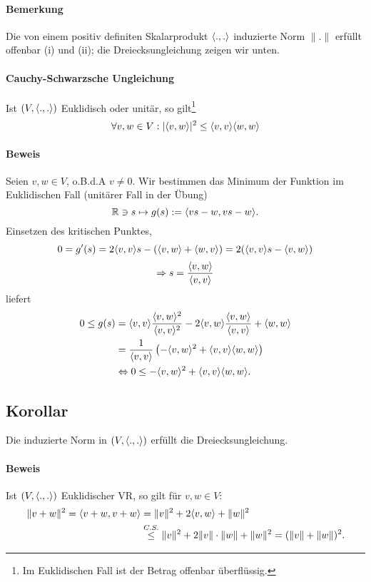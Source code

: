 \paragraph{Bemerkung}
	Die von einem positiv definiten Skalarprodukt $ \langle .,. \rangle $ induzierte Norm $ \|.\| $ erfüllt offenbar (i) und (ii); die Dreiecksungleichung zeigen wir unten.
\paragraph{Cauchy-Schwarzsche Ungleichung}
\begin{Satz}
	Ist $ (V,\langle .,. \rangle) $ Euklidisch oder unitär, so gilt\footnote{Im Euklidischen Fall ist der Betrag offenbar überflüssig.}
		\[ \forall v,w\in V: |\langle v,w \rangle|^2 \leq \langle v,v \rangle\langle w,w \rangle \]
\end{Satz}
\paragraph{Beweis}
	Seien $ v,w\in V $, o.B.d.A $ v\neq 0 $. Wir bestimmen das Minimum der Funktion im Euklidischen Fall (unitärer Fall in der Übung)
		\[ \mathbb{R} \ni s\mapsto g(s):= \langle vs-w,vs-w \rangle. \]
	Einsetzen des kritischen Punktes,
		\[ 0 = g'(s) = 2\langle v,v \rangle s -(\langle v,w \rangle+\langle w,v \rangle) = 2(\langle v,v \rangle s-\langle v,w \rangle) \]
		\[ \Rightarrow s = \frac{\langle v,w \rangle}{\langle v,v \rangle} \]
	liefert
		\begin{align*}
			0\leq g(s) &= \langle v,v \rangle\frac{\langle v,w \rangle^2}{\langle v,v \rangle^2}-2\langle v,w \rangle\frac{\langle v,w \rangle}{\langle v,v \rangle}+\langle w,w \rangle\\
			&= \frac{1}{\langle v,v \rangle}\left(-\langle v,w \rangle^2+\langle v,v \rangle\langle w,w \rangle \right) \\
			&\Leftrightarrow 0\leq -\langle v,w \rangle^2+\langle v,v \rangle\langle w,w \rangle.
		\end{align*}
		
\subsection{Korollar}
\begin{Korollar}[]
	Die induzierte Norm in $ (V,\langle .,. \rangle) $ erfüllt die Dreiecksungleichung.
\end{Korollar}
\paragraph{Beweis}
	Ist $ (V,\langle .,. \rangle) $ Euklidischer VR, so gilt für $ v,w\in V $:
		\begin{align*}
		\|v+w\|^2 = \langle v+w,v+w \rangle &= \|v\|^2+2\langle v,w \rangle+\|w\|^2 \\
		&\overset{C.S.}{\leq} \|v\|^2+2\|v\|\cdot \|w\|+\|w\|^2 = (\|v\|+\|w\|)^2.
		\end{align*}
